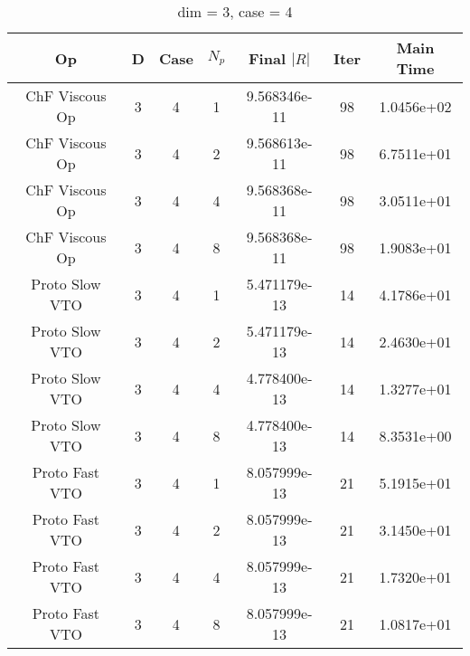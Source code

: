 \documentclass{article}
\begin{document}
\begin{small} 
  \begin{table} [p]
    \begin{center}
      \begin{tabular}{|c|c|c|c|c|c||c|} \hline
        Op & D & Case & $N_p$ & Final $|R|$  &  Iter & Main Time \\
        \hline
        ChF Viscous Op & 3 & 4 & 1& 9.568346e-11 & 98 & 1.0456e+02\\
        ChF Viscous Op & 3 & 4 & 2& 9.568613e-11 & 98 & 6.7511e+01\\
        ChF Viscous Op & 3 & 4 & 4& 9.568368e-11 & 98 & 3.0511e+01\\
        ChF Viscous Op & 3 & 4 & 8& 9.568368e-11 & 98 & 1.9083e+01\\
        Proto Slow VTO & 3 & 4 & 1& 5.471179e-13 & 14 & 4.1786e+01\\
        Proto Slow VTO & 3 & 4 & 2& 5.471179e-13 & 14 & 2.4630e+01\\
        Proto Slow VTO & 3 & 4 & 4& 4.778400e-13 & 14 & 1.3277e+01\\
        Proto Slow VTO & 3 & 4 & 8& 4.778400e-13 & 14 & 8.3531e+00\\
        Proto Fast VTO & 3 & 4 & 1& 8.057999e-13 & 21 & 5.1915e+01\\
        Proto Fast VTO & 3 & 4 & 2& 8.057999e-13 & 21 & 3.1450e+01\\
        Proto Fast VTO & 3 & 4 & 4& 8.057999e-13 & 21 & 1.7320e+01\\
        Proto Fast VTO & 3 & 4 & 8& 8.057999e-13 & 21 & 1.0817e+01\\
        \hline
      \end{tabular} 
    \end{center}   
    \label{__dim_=_3__case_=_4} 
    \caption{dim = 3, case = 4} 
  \end{table} 
\end{small}






\end{document}
